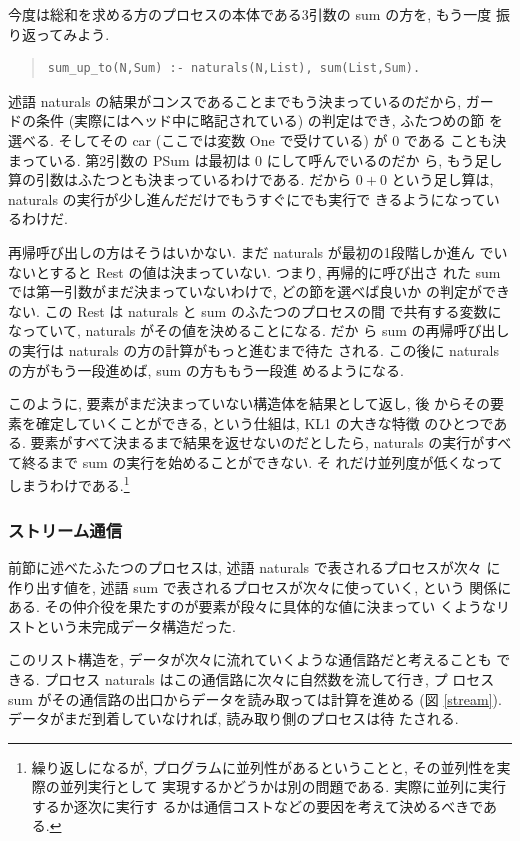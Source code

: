 \documentclass[a4,titlepage]{jsreport}
\newenvironment{program}{\begin{quote}}{\end{quote}}
\begin{document}
今度は総和を求める方のプロセスの本体である3引数の sum の方を, もう一度
振り返ってみよう.
\begin{program}
\begin{verbatim}
sum_up_to(N,Sum) :- naturals(N,List), sum(List,Sum).
\end{verbatim}
\end{program}
述語 naturals の結果がコンスであることまでもう決まっているのだから, ガー
ドの条件 (実際にはヘッド中に略記されている) の判定はでき, ふたつめの節
を選べる.  そしてその car (ここでは変数 One で受けている) が 0 である
ことも決まっている.  第2引数の PSum は最初は 0 にして呼んでいるのだか
ら, もう足し算の引数はふたつとも決まっているわけである.  だから $0+0$ 
という足し算は, naturals の実行が少し進んだだけでもうすぐにでも実行で
きるようになっているわけだ.

再帰呼び出しの方はそうはいかない.  まだ naturals が最初の1段階しか進ん
でいないとすると Rest の値は決まっていない.  つまり, 再帰的に呼び出さ
れた sum では第一引数がまだ決まっていないわけで, どの節を選べば良いか
の判定ができない.  この Rest は naturals と sum のふたつのプロセスの間
で共有する変数になっていて, naturals がその値を決めることになる.  だか
ら sum の再帰呼び出しの実行は naturals の方の計算がもっと進むまで待た
される.  この後に naturals の方がもう一段進めば, sum の方ももう一段進
めるようになる.

このように, 要素がまだ決まっていない構造体を結果として返し, 後
からその要素を確定していくことができる, という仕組は, KL1 の大きな特徴
のひとつである.  要素がすべて決まるまで結果を返せないのだとしたら,
naturals の実行がすべて終るまで sum の実行を始めることができない.  そ
れだけ並列度が低くなってしまうわけである.\footnote{繰り返しになるが, 
プログラムに並列性があるということと, その並列性を実際の並列実行として
実現するかどうかは別の問題である.  実際に並列に実行するか逐次に実行す
るかは通信コストなどの要因を考えて決めるべきである.}

\subsubsection{ストリーム通信}
前節に述べたふたつのプロセスは, 述語 naturals で表されるプロセスが次々
に作り出す値を, 述語 sum で表されるプロセスが次々に使っていく, という
関係にある.  その仲介役を果たすのが要素が段々に具体的な値に決まってい
くようなリストという未完成データ構造だった.

このリスト構造を, データが次々に流れていくような通信路だと考えることも
できる.  プロセス naturals はこの通信路に次々に自然数を流して行き, プ
ロセス sum がその通信路の出口からデータを読み取っては計算を進める (図 
\ref{stream}).  データがまだ到着していなければ, 読み取り側のプロセスは待
たされる.
\end{document}
